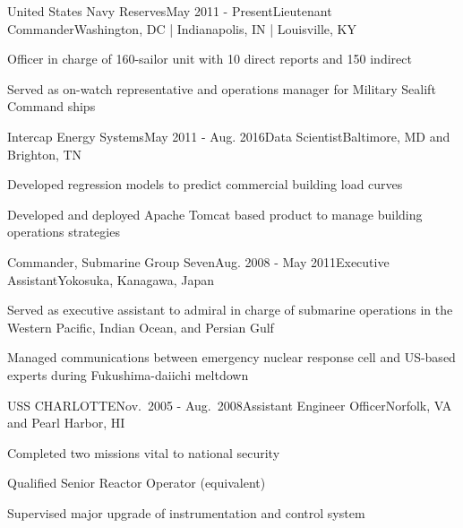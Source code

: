 


\begin{rSubsection}{United States Navy Reserves}{May 2011 - Present}{Lieutenant Commander}{Washington, DC | Indianapolis, IN | Louisville, KY}
\item Officer in charge of 160-sailor unit with 10 direct reports and 150 indirect
\item Served as on-watch representative and operations manager for Military Sealift Command ships 
\end{rSubsection}


\begin{rSubsection}{Intercap Energy Systems}{May 2011 - Aug. 2016}{Data Scientist}{Baltimore, MD and Brighton, TN}
\item Developed regression models to predict commercial building load curves
\item Developed and deployed Apache Tomcat based product to manage building operations strategies
\end{rSubsection}


\begin{rSubsection}{Commander, Submarine Group Seven}{Aug. 2008 - May 2011}{Executive Assistant}{Yokosuka, Kanagawa, Japan}
\item Served as executive assistant to admiral in charge of submarine operations in the Western Pacific, Indian Ocean, and Persian Gulf
\item Managed communications between emergency nuclear response cell and US-based experts during Fukushima-daiichi meltdown
\end{rSubsection}


\begin{rSubsection}{USS CHARLOTTE}{Nov.\ 2005 - Aug.\ 2008}{Assistant Engineer Officer}{Norfolk, VA and Pearl Harbor, HI}
\item Completed two missions vital to national security
\item Qualified Senior Reactor Operator (equivalent)
\item Supervised major upgrade of instrumentation and control system
\end{rSubsection}
